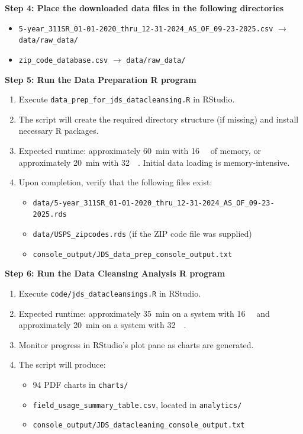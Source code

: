 \documentclass[linenumber]{jdsart}
\begin{document}
\medskip\noindent\textbf{Step 4: Place the downloaded data files in the following directories}


\begin{itemize}
\item \texttt{5-year\_311SR\_01-01-2020\_thru\_12-31-2024\_AS\_OF\_09-23-2025.csv} $\rightarrow$ \texttt{data/raw\_data/}
\item \texttt{zip\_code\_database.csv} $\rightarrow$ \texttt{data/raw\_data/}
\end{itemize}


\medskip\noindent\textbf{Step 5: Run the Data Preparation R program}


\begin{enumerate}
\item Execute \texttt{data\_prep\_for\_jds\_datacleansing.R} in RStudio.
\item The script will create the required directory structure (if missing) and install necessary R packages.
\item Expected runtime: approximately \SI{60}{\minute} with \SI{16}{\giga\byte} of memory,
or approximately \SI{20}{\minute} with \SI{32}{\giga\byte}.
Initial data loading is memory-intensive.
\item Upon completion, verify that the following files exist:
  \begin{itemize}
    \item \texttt{data/5-year\_311SR\_01-01-2020\_thru\_12-31-2024\_AS\_OF\_09-23-2025.rds}
    \item \texttt{data/USPS\_zipcodes.rds} (if the ZIP code file was supplied)
    \item \texttt{console\_output/JDS\_data\_prep\_console\_output.txt}
  \end{itemize}
\end{enumerate}


\medskip\noindent\textbf{Step 6: Run the Data Cleansing Analysis R program}


\begin{enumerate}
\item Execute \texttt{code/jds\_datacleansings.R} in RStudio.
\item Expected runtime: approximately \SI{35}{\minute}
on a system with \SI{16}{\giga\byte} and approximately \SI{20}{\minute} 
on a system with \SI{32}{\giga\byte}.
\item Monitor progress in RStudio's plot pane as charts are generated.
\item The script will produce:
  \begin{itemize}
    \item \num{94} PDF charts in \texttt{charts/}
    \item \texttt{field\_usage\_summary\_table.csv}, located in \texttt{analytics/}
    \item \texttt{console\_output/JDS\_datacleaning\_console\_output.txt}
  \end{itemize}
\end{enumerate}
\end{document}
